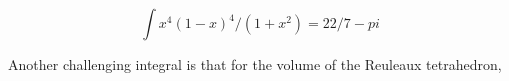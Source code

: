 $$ \int x^4 (1-x)^4 / (1+x^2) = 22/7 - pi$$





Another challenging integral is that for the volume of the Reuleaux tetrahedron,





